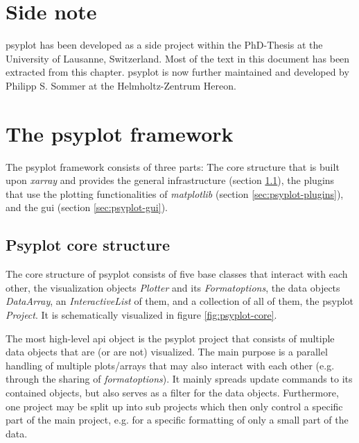 \documentclass[
11pt, %
english, %
singlespacing, %
headsepline, %
]{article} %
\begin{document}
\begin{refsection}
\section*{Side note}

psyplot has been developed as a side project within the PhD-Thesis \cite{Sommer2020e} at the University of Lausanne, Switzerland. Most of the text in this document has been extracted from this chapter. psyplot is now further maintained and developed by Philipp S. Sommer at the Helmholtz-Zentrum Hereon.

\section{The psyplot framework}  \label{sec:psyplot-framework}

The psyplot framework consists of three parts: The core structure that is built upon \textit{xarray} and provides the general infrastructure (section \ref{sec:psyplot-core}), the plugins that use the plotting functionalities of \textit{matplotlib} (section \ref{sec:psyplot-plugins}), and the \gls{gui} (section \ref{sec:psyplot-gui}).


\subsection{Psyplot core structure}  \label{sec:psyplot-core}

The core structure of psyplot consists of five base classes that interact with each other, the visualization objects \textit{Plotter} and its \textit{Formatoptions}, the data objects \textit{DataArray}, an \textit{InteractiveList} of them, and a collection of all of them, the psyplot \textit{Project}. It is schematically visualized in figure \ref{fig:psyplot-core}.

The most high-level \gls{api} object is the psyplot project that consists of multiple data objects that are (or are not) visualized. The main purpose is a parallel handling of multiple plots/arrays that may also interact with each other (e.g. through the sharing of \textit{formatoptions}). It mainly spreads update commands to its contained objects, but also serves as a filter for the data objects. Furthermore, one project may be split up into sub projects which then only control a specific part of the main project, e.g. for a specific formatting of only a small part of the data.


\end{refsection}
\end{document}
